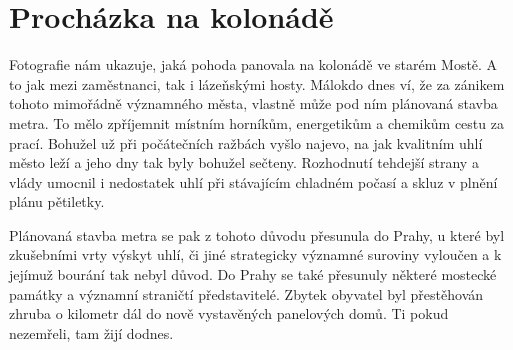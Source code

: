 
\chapter{Procházka na kolonádě}

Fotografie nám ukazuje, jaká pohoda panovala na kolonádě ve starém
Mostě. A to jak mezi zaměstnanci, tak i lázeňskými hosty. Málokdo dnes
ví, že za zánikem tohoto mimořádně významného města, vlastně může pod
ním plánovaná stavba metra. To mělo zpříjemnit místním horníkům,
energetikům a chemikům cestu za prací. Bohužel už při počátečních
ražbách vyšlo najevo, na jak kvalitním uhlí město leží a jeho dny tak
byly bohužel sečteny. Rozhodnutí tehdejší strany a vlády umocnil i
nedostatek uhlí při stávajícím chladném počasí a skluz v plnění plánu
pětiletky.

Plánovaná stavba metra se pak z tohoto důvodu přesunula do Prahy, u
které byl zkušebními vrty výskyt uhlí, či jiné strategicky významné
suroviny vyloučen a k jejímuž bourání tak nebyl důvod. Do Prahy se
také přesunuly některé mostecké památky a významní straničtí
představitelé. Zbytek obyvatel byl přestěhován zhruba o kilometr dál
do nově vystavěných panelových domů. Ti pokud nezemřeli, tam žijí
dodnes.
